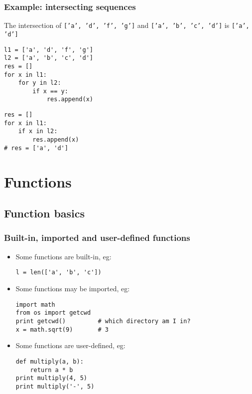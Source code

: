 \begin{frame}[fragile]
  \frametitle{Example: intersecting sequences}

  The intersection of \newline
  \texttt{['a', 'd', 'f', 'g']} and \texttt{['a', 'b', 'c', 'd']} \newline
  is \texttt{['a', 'd']}

  \pause
{\small
\begin{verbatim}
l1 = ['a', 'd', 'f', 'g']
l2 = ['a', 'b', 'c', 'd']
res = []
for x in l1:
    for y in l2:
        if x == y:
            res.append(x)
\end{verbatim}}
  \pause
{\small
\begin{verbatim}
res = []
for x in l1:
    if x in l2:
        res.append(x)
# res = ['a', 'd']
\end{verbatim}}
\end{frame}


\section{Functions}
\subsection{Function basics}
\begin{frame}[fragile]
  \frametitle{Built-in, imported and user-defined functions}

  \begin{itemize}
  \item<1-> Some functions are built-in, eg:
    \begin{verbatim}
l = len(['a', 'b', 'c'])      
    \end{verbatim}
  \item<2-> Some functions may be imported, eg:
    \begin{verbatim}
import math
from os import getcwd
print getcwd()         # which directory am I in?
x = math.sqrt(9)       # 3
    \end{verbatim}
  \item<3-> Some functions are user-defined, eg:
    \begin{verbatim}
def multiply(a, b):
    return a * b
print multiply(4, 5)
print multiply('-', 5)
    \end{verbatim}
  \end{itemize}
\end{frame}

